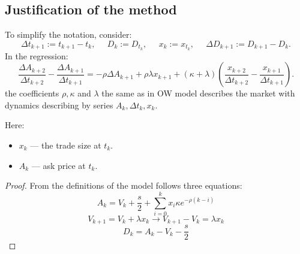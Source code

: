 \begin{appendices} %



	\section{Justification of the method}
        
        \begin{theorem}
                To simplify the notation, consider:
        \[ \Delta t_{k+1} := t_{k+1} - t_k, \; \; \; \; \; D_k := D_{t_k}, \; \; \; \; \; x_{k}:= x_{t_k}, \; \; \; \; \; \Delta D_{k+1} := D_{k+1} - D_k . \]
                In the regression:                                                                                                                                                                                                                                                                                                                                                                                        
                \begin{equation*}
                    \frac{\Delta A_{k+2}}{\Delta t_{k+2}} - \frac{\Delta A_{k+1}}{\Delta t_{k+1}} 
                = - \rho \Delta A_{k+1} + \rho \lambda x_{k+1} + (\kappa + \lambda) (\frac{x_{k+2}}{\Delta t_{k+2}} - \frac{x_{k+1}}{\Delta t_{k+1}}).
                \end{equation*}
                the coefficients $\rho, \kappa$ and $\lambda$ the same as in OW model describes the market with dynamics
                describing by series $A_k, \Delta t _k, x_k$.
        
        Here:
        \begin{itemize}
         \item $x_{k}$ 
         --- the trade size at $t_k$.
         \item $A_{k}$ --- ask price at $t_k$. 
        \end{itemize}

\end{theorem}
\begin{proof}
        From the definitions of the model follows three equations:
        \begin{equation} \label{rp1}
                A_k = V_k + \frac{s}{2} + \sum _{i=0} ^k x_i \kappa e^{- \rho (k - i)}
        \end{equation}
        \begin{equation}\label{rp2}
                V_{k+1} = V_k + \lambda x_k \rightarrow V_{k+1} - V_k = \lambda x_{k}
        \end{equation}
        \begin{equation} \label{rp3}
                D_k = A_k - V_k - \frac{s}{2}
        \end{equation}


\end{proof}
\end{appendices}
